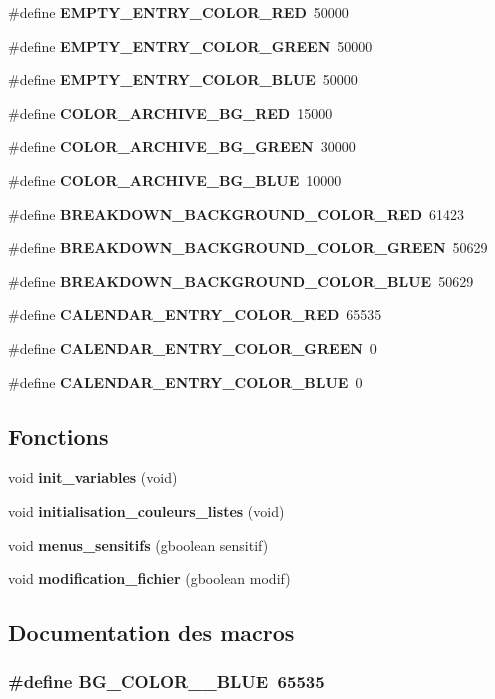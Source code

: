 \begin{DoxyCompactItemize}
\#define {\bf EMPTY\_\-ENTRY\_\-COLOR\_\-RED}~50000
\item 
\#define {\bf EMPTY\_\-ENTRY\_\-COLOR\_\-GREEN}~50000
\item 
\#define {\bf EMPTY\_\-ENTRY\_\-COLOR\_\-BLUE}~50000
\item 
\#define {\bf COLOR\_\-ARCHIVE\_\-BG\_\-RED}~15000
\item 
\#define {\bf COLOR\_\-ARCHIVE\_\-BG\_\-GREEN}~30000
\item 
\#define {\bf COLOR\_\-ARCHIVE\_\-BG\_\-BLUE}~10000
\item 
\#define {\bf BREAKDOWN\_\-BACKGROUND\_\-COLOR\_\-RED}~61423
\item 
\#define {\bf BREAKDOWN\_\-BACKGROUND\_\-COLOR\_\-GREEN}~50629
\item 
\#define {\bf BREAKDOWN\_\-BACKGROUND\_\-COLOR\_\-BLUE}~50629
\item 
\#define {\bf CALENDAR\_\-ENTRY\_\-COLOR\_\-RED}~65535
\item 
\#define {\bf CALENDAR\_\-ENTRY\_\-COLOR\_\-GREEN}~0
\item 
\#define {\bf CALENDAR\_\-ENTRY\_\-COLOR\_\-BLUE}~0
\end{DoxyCompactItemize}
\subsection*{Fonctions}
\begin{DoxyCompactItemize}
\item 
void {\bf init\_\-variables} (void)
\item 
void {\bf initialisation\_\-couleurs\_\-listes} (void)
\item 
void {\bf menus\_\-sensitifs} (gboolean sensitif)
\item 
void {\bf modification\_\-fichier} (gboolean modif)
\end{DoxyCompactItemize}


\subsection{Documentation des macros}
\subsubsection[{BG\_\-COLOR\_\-1\_\-BLUE}]{\setlength{\rightskip}{0pt plus 5cm}\#define BG\_\-COLOR\_\_\-BLUE~65535}\label{traitement__variables_8h_a76675dad90a83a5aaf6994edaca890f7}


